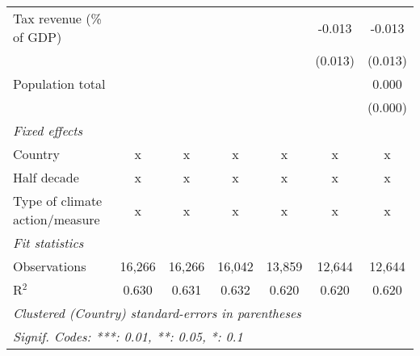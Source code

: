 \begin{tabular}{lcccccc}
   Tax revenue (\% of GDP)                &              &              &              &               & -0.013        & -0.013\\   
                                          &              &              &              &               & (0.013)       & (0.013)\\   
   Population total                       &              &              &              &               &               & 0.000\\   
                                          &              &              &              &               &               & (0.000)\\   
   \emph{Fixed effects}\\
   Country                                & x            & x            & x            & x             & x             & x\\  
   Half decade                            & x            & x            & x            & x             & x             & x\\  
   Type of climate action/measure         & x            & x            & x            & x             & x             & x\\  
   \midrule \emph{Fit statistics}\\
   Observations                           & 16,266       & 16,266       & 16,042       & 13,859        & 12,644        & 12,644\\  
   R$^2$                                  & 0.630        & 0.631        & 0.632        & 0.620         & 0.620         & 0.620\\  
   \midrule
   \multicolumn{7}{l}{\emph{Clustered (Country) standard-errors in parentheses}}\\
   \multicolumn{7}{l}{\emph{Signif. Codes: ***: 0.01, **: 0.05, *: 0.1}}\\
\end{tabular}
\par\endgroup


